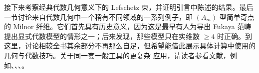 接下来考察经典代数几何意义下的 Lefschetz 束，并证明引言中陈述的结果。最后一节讨论来自代数几何中一个稍有不同领域的一系列例子，即 $(A_m)$ 型简单奇点的 Milnor 纤维。它们首先具有历史意义，因为这是最早有人为导出 Fukaya 范畴提出显式代数模型的情形之一；后来发现，那些模型只在实维数 $\geq4$ 时正确。到这里，讨论相较全书其余部分不再那么自足，但希望能借此展示具体计算中使用的几何与代数技巧。关于同一套一般工具的更复杂
应用，请读者参看文献，例如、、、。
